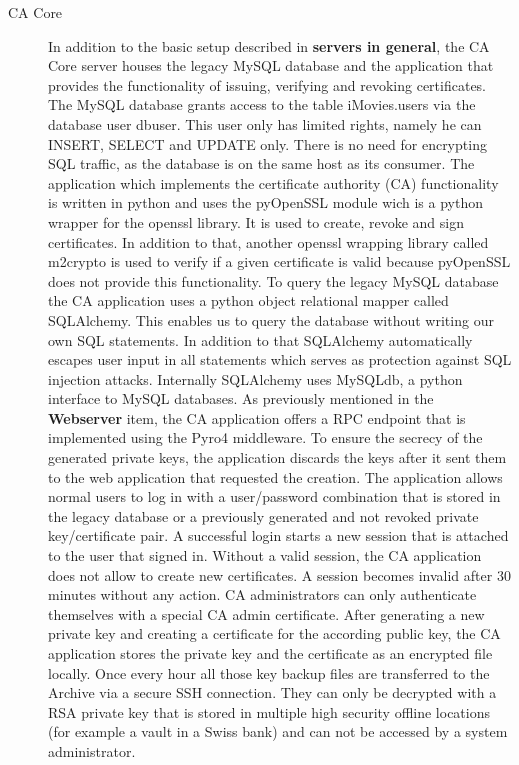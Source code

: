 \documentclass[a4paper, toc=index, 12pt, DIV14, twoside, BCOR2cm, headsepline, numbers=noenddot, bibliography=totoc]{scrbook}
\begin{document}
\begin{description}
\item[CA Core ] In addition to the basic setup described in {\bfseries servers in general}, the CA Core server houses the legacy MySQL database and the application that provides the functionality of issuing, verifying and revoking certificates. \newline
The MySQL database grants access to the table iMovies.users via the database user dbuser. This user only has limited rights, namely he can INSERT, SELECT and UPDATE only. There is no need for encrypting SQL traffic, as the database is on the same host as its consumer.\newline
The application which implements the certificate authority (CA) functionality is written in python and uses the pyOpenSSL module wich is a python wrapper for the openssl library. It is used to create, revoke and sign certificates. In addition to that, another openssl wrapping library called m2crypto is used to verify if a given certificate is valid because pyOpenSSL does not provide this functionality.\newline
To query the legacy MySQL database the CA application uses a python object relational mapper called SQLAlchemy. This enables us to query the database without writing our own SQL statements. In addition to that SQLAlchemy automatically escapes user input in all statements which serves as protection against SQL injection attacks. Internally SQLAlchemy uses MySQLdb, a python interface to MySQL databases.\newline
As previously mentioned in the {\bfseries Webserver} item, the CA application offers a RPC endpoint that is implemented using the Pyro4 middleware.\newline
To ensure the secrecy of the generated private keys, the application discards the keys after it sent them to the web application that requested the creation.\newline
The application allows normal users to log in with a user/password combination that is stored in the legacy database or a previously generated and not revoked private key/certificate pair. A successful login starts a new session that is attached to the user that signed in. Without a valid session, the CA application does not allow to create new certificates. A session becomes invalid after 30 minutes without any action. CA administrators can only authenticate themselves with a special CA admin certificate.\newline
After generating a new private key and creating a certificate for the according public key, the CA application stores the private key and the certificate as an encrypted file locally. Once every hour all those key backup files are transferred to the Archive via a secure SSH connection. They can only be decrypted with a RSA private key that is stored in multiple high security offline locations (for example a vault in a Swiss bank) and can not be accessed by a system administrator.\newline

\end{description}
\end{document}
